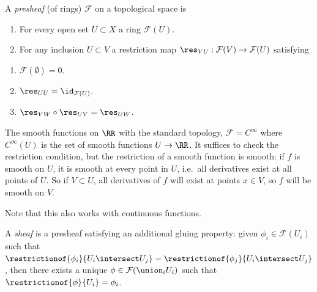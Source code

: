 \begin{definition}[Presheaf]

A \emph{presheaf} (of rings) \(\mathcal{F}\) on a topological space is

\begin{enumerate}
\def\labelenumi{\arabic{enumi}.}
\item
  For every open set \(U\subset X\) a ring \(\mathcal{F}(U)\).
\item
  For any inclusion \(U\subset V\) a restriction map
  \(\res_{VU}: \mathcal{F}(V) \to \mathcal{F}(U)\) satisfying
\end{enumerate}

\begin{enumerate}
\def\labelenumi{\alph{enumi}.}
\tightlist
\item
  \(\mathcal{F}(\emptyset) = 0\).
\item
  \(\res_{UU} = \id_{\mathcal{F}(U)}\).
\item
  \(\res_{VW} \circ \res_{UV} = \res_{UW}\).
\end{enumerate}

\end{definition}

\begin{example}

The smooth functions on \(\RR\) with the standard topology,
\(\mathcal{F} = C^\infty\) where \(C^\infty(U)\) is the set of smooth
functions \(U\to \RR\). It suffices to check the restriction condition,
but the restriction of a smooth function is smooth: if \(f\) is smooth
on \(U\), it is smooth at every point in \(U\), i.e.~all derivatives
exist at all points of \(U\). So if \(V\subset U\), all derivatives of
\(f\) will exist at points \(x \in V\), so \(f\) will be smooth on
\(V\).

Note that this also works with continuous functions.

\end{example}

\begin{definition}[Sheaf]

A \emph{sheaf} is a presheaf satisfying an additional gluing property:
given \(\phi_i \in \mathcal{F}(U_i)\) such that
\(\restrictionof{\phi_i}{U_i\intersect U_j} = \restrictionof{\phi_j}{U_i \intersect U_j}\),
then there exists a unique \(\phi\in \mathcal{F}(\union_i U_i)\) such
that \(\restrictionof{\phi}{U_i} = \phi_i\).

\end{definition}

